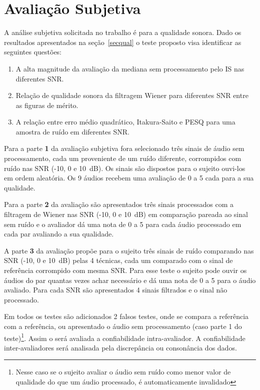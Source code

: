 \section{Avaliação Subjetiva}
A análise subjetiva solicitada no trabalho é para a qualidade sonora. Dado os resultados apresentados na seção~\ref{secqual} o teste proposto visa identificar as seguintes questões:

\begin{enumerate}
    \item A alta magnitude da avaliação da mediana sem processamento pelo IS nas diferentes SNR.
    \item Relação de qualidade sonora da filtragem Wiener para diferentes SNR entre as figuras de mérito.
    \item A relação entre erro médio quadrático, Itakura-Saito e PESQ para uma amostra de ruído em diferentes SNR.
    
\end{enumerate}

Para a parte \textbf{1} da avaliação subjetiva fora selecionado três sinais de áudio sem processamento, cada um proveniente de um ruído diferente, corrompidos com ruído nas SNR (-10, 0 e 10~dB). Os sinais são dispostos para o sujeito ouvi-los em ordem aleatória. Os 9 áudios recebem uma avaliação de 0 a 5 cada para a sua qualidade.

Para a parte \textbf{2} da avaliação são apresentados três sinais processados com a filtragem de Wiener nas SNR (-10, 0 e 10~dB) em comparação pareada ao sinal sem ruído e o avaliador dá uma nota de 0 a 5 para cada áudio processado em cada par avaliando a sua qualidade.

A parte \textbf{3} da avaliação propõe para o sujeito três sinais de ruído comparando nas SNR (-10, 0 e 10~dB) pelas 4 técnicas, cada um comparado com o sinal de referência corrompido com mesma SNR. Para esse teste o sujeito pode ouvir os áudios do par quantas vezes achar necessário e dá uma nota de 0 a 5 para o áudio avaliado. Para cada SNR são apresentados 4 sinais filtrados e o sinal não processado. 

Em todos os testes são adicionados 2 falsos testes, onde se compara a referência com a referência, ou apresentado o áudio sem processamento (caso parte 1 do teste)\footnote{Nesse caso se o sujeito avaliar o áudio sem ruído como menor valor de qualidade do que um áudio processado, é automaticamente invalidado}. Assim o será avaliada a confiabilidade intra-avaliador. A confiabilidade inter-avaliadores será analisada pela discrepância ou consonância dos dados.

